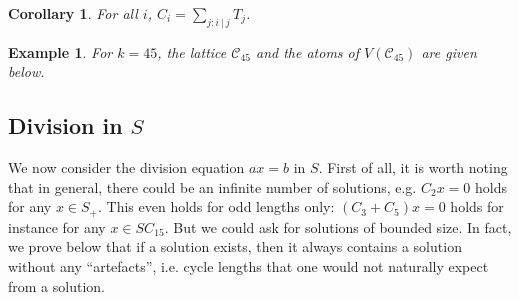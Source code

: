 \documentclass[a4paper, 11pt]{article}
\theoremstyle{plain}
\newtheorem{corollary}  [theorem]{Corollary}
\newtheorem{example}    [theorem]{Example}
\theoremstyle{definition}
\begin{document}
\begin{corollary}
For all $i$, $C_i = \sum_{j : i \ | \ j} T_j$.
\end{corollary}

\begin{example} \label{example:C45}
For $k = 45$, the lattice $\mathcal{C}_{45}$ and the atoms of $V( \mathcal{C}_{45} )$ are given below.



\end{example}


\subsection{Division in $S$} \label{subsection:division_in_S}


We now consider the division equation $ax = b$ in $S$.
First of all, it is worth noting that in general, there could be an infinite number of solutions, e.g. $C_2 x = 0$ holds for any $x \in S_+$. This even holds for odd lengths only: $(C_3 + C_5)x = 0$ holds for instance for any $x \in S C_{15}$. But we could ask for solutions of bounded size. In fact, we prove below that if a solution exists, then it always contains a solution  without any ``artefacts'', i.e. cycle lengths that one would not naturally expect from a solution. 
\end{document}
